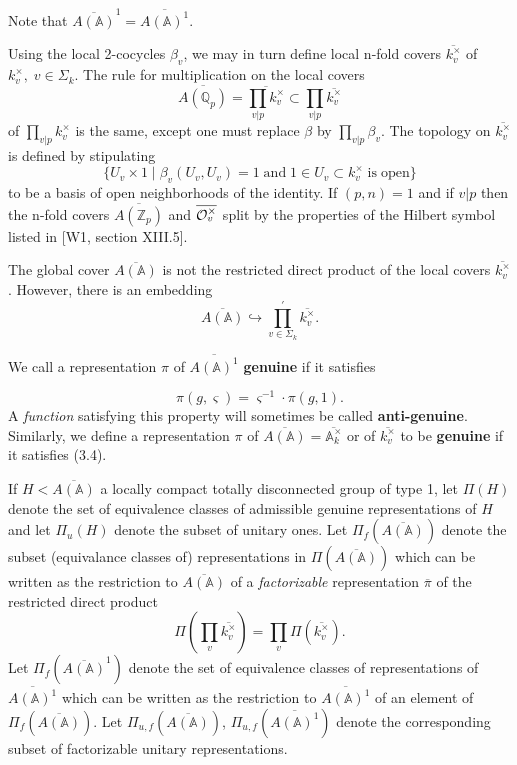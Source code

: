 Note that
$\overline{A({\mathbb{A}})}^1=\overline{A({\mathbb{A}})^1}$.

Using the local 2-cocycles $\beta _v$, we may in turn define local n-fold
covers $\overline{k_v^{\times }}$ of $k_v^{\times },\;v\in \Sigma _k$. The
rule for multiplication on the local covers
\[
\overline{A({\mathbb{Q}}_p)}=
\overline{\prod_{v|p}k_v^{\times }}
\subset \prod_{v|p}
\overline{k_v^{\times }}
\]
of $\prod_{v|p}k_v^{\times }$ is the same, except one must
replace $\beta $ by $\prod_{v|p}\beta _v$. The topology on
$\overline{k_v^{\times }}$
is defined by stipulating 
\[
\{U_v\times 1\;|\;\beta _v(U_v,U_v)=1\;\mathrm{and}\;1\in U_v\subset
k_v^{\times }\;\mathrm{is\;open}\}
\]
to be a basis of open neighborhoods of the identity.
If $(p,n)=1$ and if $v|p$ then the n-fold covers
$\overline{A(\mathbb{Z}_p)}$ and
$\overline{{\cal{O}}_v^{\times }}$ split by
the properties of the Hilbert symbol listed in [W1,
section XIII.5].

The global cover $\overline{A({\mathbb{A}})}$ is not the restricted direct
product of the local covers $\overline{k_v^{\times }}$. However, there is an
embedding 
\[
\overline{A({\mathbb{A}})}\hookrightarrow
\prod_{v\in \Sigma _k}^{\prime }\overline{k_v^{\times }}.
\]

We call a representation $\pi $ of $\overline{A({\mathbb{A}})^1}$
\textbf{genuine} if it satisfies

\begin{equation}
\pi (g,\varsigma )=\varsigma^{-1} \cdot \pi (g,1).
\end{equation}
A {\em function} satisfying this property will sometimes be
called {\bf anti-genuine}.
Similarly, we define a representation $\pi $ of
$\overline{A({\mathbb{A}})}=\overline{{\mathbb{A}}_k^{\times }}$ or
of $\overline{k_v^{\times }}$ to be 
\textbf{genuine} if it satisfies (3.4).

If $H<\overline{A({\mathbb{A}})}$ a locally compact totally disconnected group
of type 1, let $\Pi (H)$ denote
the set of equivalence classes of admissible genuine
representations of $H$ and
let $\Pi_u(H)$ denote the subset of unitary ones.
Let $\Pi_f (\overline{A({\mathbb{A}})})$
denote the subset (equivalance classes of) representations in
$\Pi(\overline{A({\mathbb{A}})})$ which can be written as the
restriction to $\overline{A({\mathbb{A}})}$
of a {\em factorizable} representation $\overline{\pi }$
of the restricted direct product 
\[
\Pi (\prod_v\overline{k_v^{\times }})=\prod_v
\Pi (\overline{k_v^{\times }}).
\]
Let $\Pi_f (\overline{A({\mathbb{A}})}^1)$ denote the
set of equivalence classes of
representations of $\overline{A({\mathbb{A}})^1}$ which can be written as the
restriction to $\overline{A({\mathbb{A}})^1}$ of an element of
$\Pi_f (\overline{A({\mathbb{A}})})$.
Let $\Pi_{u,f} (\overline{A({\mathbb{A}})})$,
$\Pi_{u,f} (\overline{A({\mathbb{A}})^1})$
denote the corresponding subset of factorizable unitary representations.

